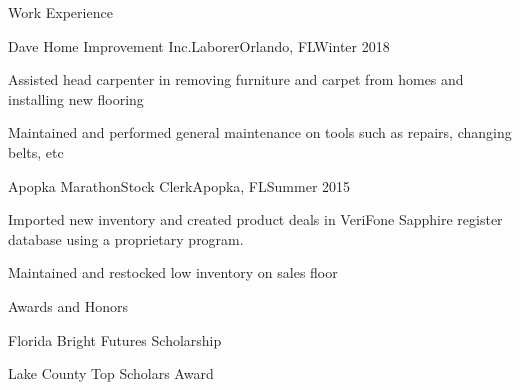 \documentclass{article}
\newlength{\tabin}
\newlength{\secsep}
\newcommand{\lineunder}{\vspace*{-8pt} \\ \hspace*{-6pt} \hrulefill \\ \vspace*{-15pt}}
\newenvironment{tabbedsection}[1]{
  \begin{list}{}{
      \setlength{\itemsep}{0pt}
      \setlength{\labelsep}{0pt}
      \setlength{\labelwidth}{0pt}
      \setlength{\leftmargin}{\tabin}
      \setlength{\rightmargin}{\tabin}
      \setlength{\listparindent}{0pt}
      \setlength{\parsep}{0pt}
      \setlength{\parskip}{1pt}
      \setlength{\partopsep}{0pt}
      \setlength{\topsep}{#1}
    }
  \item[]
}{\end{list}}
\newenvironment{resume_section}[1]{ 
  \filbreak
  \vspace{2\secsep}
  \MakeUppercase{ \large#1}
  \lineunder
  \begin{tabbedsection}{\secsep}
}{\end{tabbedsection}}
\newenvironment{resume_subsection2}[2][]{
  \textbf{#2} \hfill {\footnotesize #1} \hspace{2em}
}
\newenvironment{subitems}{
  \renewcommand{\labelitemi}{-}
  \begin{itemize}
      \setlength{\labelsep}{1em}
}{\end{itemize}}
\newenvironment{resume_employer}[4]{
  \vspace{\secsep}
  \textbf{#1} \\ 
  \indent {\small #2} \hfill {\footnotesize#3 (#4)}
  \begin{tabbedsection}{0pt}
  \begin{subitems}
}{\end{subitems}\end{tabbedsection}}
\begin{document}
 
\begin{resume_section}{Work Experience}
  \begin{resume_employer}{Dave Home Improvement  Inc.}{Laborer}{Orlando, FL}{Winter 2018}
    \item Assisted head carpenter in removing furniture and carpet from homes and installing new flooring
    \item Maintained and performed general maintenance on tools such as repairs, changing belts, etc
  \end{resume_employer}
  
  \begin{resume_employer}{Apopka Marathon}{Stock Clerk}{Apopka, FL}{Summer 2015}
    \item Imported new inventory and created product deals in VeriFone Sapphire register database using a proprietary program.
    \item Maintained and restocked low inventory on sales floor
  \end{resume_employer}
\end{resume_section}



\begin{resume_section}{Awards and Honors}
    \begin{resume_subsection2}{Florida Bright Futures Scholarship}
    \end{resume_subsection2}
    
    \begin{resume_subsection2}[May 2016]{Lake County Top Scholars Award}
    \end{resume_subsection2}
\end{resume_section}



\end{document}
